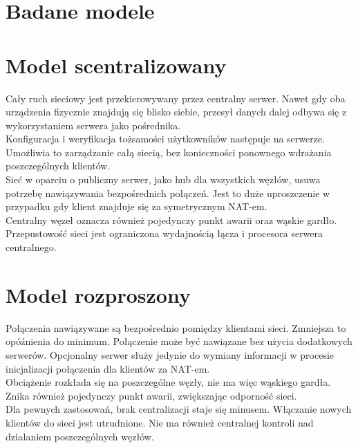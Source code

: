 \section{Badane modele}

\section{Model scentralizowany}

Cały ruch sieciowy jest przekierowywany przez centralny serwer. Nawet gdy oba urządzenia fizycznie znajdują się blisko siebie, przesył danych dalej odbywa się z wykorzystaniem serwera jako pośrednika.\\

Konfiguracja i weryfikacja tożsamości użytkowników następuje na serwerze. Umożliwia to zarządzanie całą siecią, bez konieczności ponownego wdrażania poszczególnych klientów.\\

Sieć w oparciu o publiczny serwer, jako hub dla wszystkich węzłów, usuwa potrzebę nawiązywania bezpośrednich połączeń. Jest to duże uproszczenie w przypadku gdy klient znajduje się za symetrycznym NAT-em.\\

Centralny węzeł oznacza również pojedynczy punkt awarii oraz wąskie gardło. Przepustowość sieci jest ograniczona wydajnością łącza i procesora serwera centralnego.

\section{Model rozproszony}

Połączenia nawiązywane są bezpośrednio pomiędzy klientami sieci. Zmniejsza to opóźnienia do minimum. Połączenie może być nawiązane bez użycia dodatkowych serwerów. Opcjonalny serwer służy jedynie do wymiany informacji w procesie inicjalizacji połączenia dla klientów za NAT-em.\\

Obciążenie rozkłada się na poszczególne węzły, nie ma więc wąskiego gardła. Znika również pojedynczy punkt awarii, zwiększając odporność sieci.\\

Dla pewnych zastosowań, brak centralizacji staje się minusem. Włączanie nowych klientów do sieci jest utrudnione. Nie ma również centralnej kontroli nad działaniem poszczególnych węzłów.\\